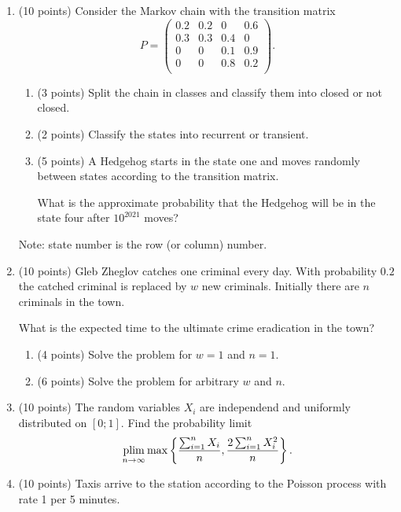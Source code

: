 \begin{enumerate}

\item (10 points) Consider the Markov chain with the transition matrix
\[
  P = \begin{pmatrix}
    0.2 & 0.2 & 0 & 0.6 \\
    0.3 & 0.3 & 0.4 & 0 \\
    0 & 0 & 0.1 & 0.9 \\
    0 & 0 & 0.8 & 0.2 \\
  \end{pmatrix}.
\]

\begin{enumerate}
  \item (3 points) Split the chain in classes and classify them into closed or not closed.
  \item (2 points) Classify the states into recurrent or transient.
  \item (5 points) A Hedgehog starts in the state one and moves 
  randomly between states according to the transition matrix.

  What is the approximate probability that the Hedgehog will be in the 
  state four after $10^{2021}$ moves?
\end{enumerate}

Note: state number is the row (or column) number.

  \item (10 points) Gleb Zheglov catches one criminal every day. 
  With probability $0.2$ the catched criminal is replaced by $w$ new criminals. 
  Initially there are $n$ criminals in the town. 

  What is the expected time to the ultimate crime eradication in the town?

  \begin{enumerate}
    \item (4 points) Solve the problem for $w=1$ and $n=1$.
    \item (6 points) Solve the problem for arbitrary $w$ and $n$.
  \end{enumerate}

  \item (10 points) The random variables $X_i$ are independend and uniformly distributed on $[0;1]$.
  Find the probability limit
\[
\operatorname*{plim}_{n\to\infty}  \max \left\{ \frac{\sum_{i=1}^n X_i}{n}, \frac{2\sum_{i=1}^n X^2_i}{n} \right\}.
\]


\item (10 points) Taxis arrive to the station according to the Poisson process with rate 1 per 5 minutes. 


\end{enumerate}
